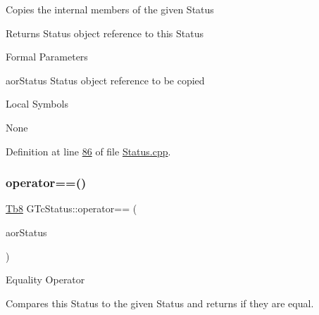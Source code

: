 Copies the internal members of the given Status

\begin{DoxyReturn}{Returns}
Status object reference to this Status
\end{DoxyReturn}
\begin{DoxyParagraph}{Formal Parameters}

\begin{DoxyPre}{\ttfamily [ in ]  aorStatus    Status object reference to be copied }\end{DoxyPre}

\end{DoxyParagraph}
\begin{DoxyParagraph}{Local Symbols}

\begin{DoxyPre}{\ttfamily  None }\end{DoxyPre}
 
\end{DoxyParagraph}


Definition at line \mbox{\hyperlink{_status_8cpp_source_l00086}{86}} of file \mbox{\hyperlink{_status_8cpp_source}{Status.\+cpp}}.

\mbox{\label{class_g_n_common_1_1_g_n_notification_1_1_g_tc_status_a4a6e0ea098233c1e73b86136327e4483}} 
\subsubsection{\texorpdfstring{operator==()}{operator==()}}
{\footnotesize\ttfamily \mbox{\hyperlink{namespace_g_n_common_a8115dc7ed53b6e5b52e6bfde1632ea74}{Tb8}} G\+Tc\+Status\+::operator== (\begin{DoxyParamCaption}\item[{const \mbox{\hyperlink{class_g_n_common_1_1_g_n_notification_1_1_g_tc_status}{G\+Tc\+Status}} \&}]{aor\+Status }\end{DoxyParamCaption})}

Equality Operator

Compares this Status to the given Status and returns if they are equal.

